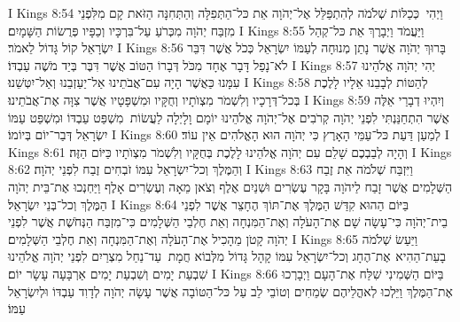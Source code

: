 I Kings 8:54	וַיְהִי  כְּכַלּוֹת שְׁלֹמֹה לְהִתְפַּלֵּל אֶל־יְהֹוָה אֵת כּל־הַתְּפִלָּה וְהַתְּחִנָּה הַזֹּאת קָם מִלִּפְנֵי מִזְבַּח יְהֹוָה מִכְּרֹעַ עַל־בִּרְכָּיו וְכַפָּיו פְּרֻשׂוֹת הַשָּׁמָיִם׃
I Kings 8:55	וַיַּעֲמֹד וַיְבָרֶךְ אֵת כּל־קְהַל יִשְׂרָאֵל קוֹל גָּדוֹל לֵאמֹר׃
I Kings 8:56	בָּרוּךְ יְהֹוָה אֲשֶׁר נָתַן מְנוּחָה לְעַמּוֹ יִשְׂרָאֵל כְּכֹל אֲשֶׁר דִּבֵּר לֹא־נָפַל דָּבָר אֶחָד מִכֹּל דְּבָרוֹ הַטּוֹב אֲשֶׁר דִּבֶּר בְּיַד מֹשֶׁה עַבְדּוֹ׃
I Kings 8:57	יְהִי יְהֹוָה אֱלֹהֵינוּ עִמָּנוּ כַּאֲשֶׁר הָיָה עִם־אֲבֹתֵינוּ אַל־יַעַזְבֵנוּ וְאַל־יִטְּשֵׁנוּ׃
I Kings 8:58	לְהַטּוֹת לְבָבֵנוּ אֵלָיו לָלֶכֶת בְּכל־דְּרָכָיו וְלִשְׁמֹר מִצְוֺתָיו וְחֻקָּיו וּמִשְׁפָּטָיו אֲשֶׁר צִוָּה אֶת־אֲבֹתֵינוּ׃
I Kings 8:59	וְיִהְיוּ דְבָרַי אֵלֶּה אֲשֶׁר הִתְחַנַּנְתִּי לִפְנֵי יְהֹוָה קְרֹבִים אֶל־יְהֹוָה אֱלֹהֵינוּ יוֹמָם וָלָיְלָה לַעֲשׂוֹת  מִשְׁפַּט עַבְדּוֹ וּמִשְׁפַּט עַמּוֹ יִשְׂרָאֵל דְּבַר־יוֹם בְּיוֹמוֹ׃
I Kings 8:60	לְמַעַן דַּעַת כּל־עַמֵּי הָאָרֶץ כִּי יְהֹוָה הוּא הָאֱלֹהִים אֵין עוֹד׃
I Kings 8:61	וְהָיָה לְבַבְכֶם שָׁלֵם עִם יְהֹוָה אֱלֹהֵינוּ לָלֶכֶת בְּחֻקָּיו וְלִשְׁמֹר מִצְוֺתָיו כַּיּוֹם הַזֶּה׃
I Kings 8:62	וְהַמֶּלֶךְ וְכל־יִשְׂרָאֵל עִמּוֹ זֹבְחִים זֶבַח לִפְנֵי יְהֹוָה׃
I Kings 8:63	וַיִּזְבַּח שְׁלֹמֹה אֵת זֶבַח הַשְּׁלָמִים אֲשֶׁר זָבַח לַיהֹוָה בָּקָר עֶשְׂרִים וּשְׁנַיִם אֶלֶף וְצֹאן מֵאָה וְעֶשְׂרִים אָלֶף וַיַּחְנְכוּ אֶת־בֵּית יְהֹוָה הַמֶּלֶךְ וְכל־בְּנֵי יִשְׂרָאֵל׃
I Kings 8:64	בַּיּוֹם הַהוּא קִדַּשׁ הַמֶּלֶךְ אֶת־תּוֹךְ הֶחָצֵר אֲשֶׁר לִפְנֵי בֵית־יְהֹוָה כִּי־עָשָׂה שָׁם אֶת־הָעֹלָה וְאֶת־הַמִּנְחָה וְאֵת חֶלְבֵי הַשְּׁלָמִים כִּי־מִזְבַּח הַנְּחֹשֶׁת אֲשֶׁר לִפְנֵי יְהֹוָה קָטֹן מֵהָכִיל אֶת־הָעֹלָה וְאֶת־הַמִּנְחָה וְאֵת חֶלְבֵי הַשְּׁלָמִים׃
I Kings 8:65	וַיַּעַשׂ שְׁלֹמֹה בָעֵת־הַהִיא  אֶת־הֶחָג וְכל־יִשְׂרָאֵל עִמּוֹ קָהָל גָּדוֹל מִלְּבוֹא חֲמָת  עַד־נַחַל מִצְרַיִם לִפְנֵי יְהֹוָה אֱלֹהֵינוּ שִׁבְעַת יָמִים וְשִׁבְעַת יָמִים אַרְבָּעָה עָשָׂר יוֹם׃
I Kings 8:66	בַּיּוֹם הַשְּׁמִינִי שִׁלַּח אֶת־הָעָם וַיְבָרְכוּ אֶת־הַמֶּלֶךְ וַיֵּלְכוּ לְאהֳלֵיהֶם שְׂמֵחִים וְטוֹבֵי לֵב עַל כּל־הַטּוֹבָה אֲשֶׁר עָשָׂה יְהֹוָה לְדָוִד עַבְדּוֹ וּלְיִשְׂרָאֵל עַמּוֹ׃
